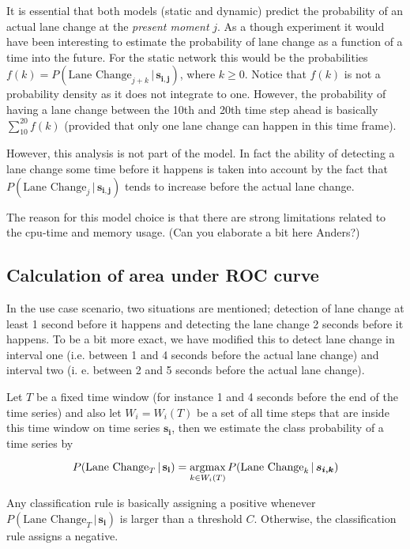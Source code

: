 \documentclass{article}
\theoremstyle{theorem}
\theoremstyle{definition}
\newcommand{\bu}[1]{\mathbf{#1}}
\newcommand{\bv}[1]{\bm{#1}}
\newcommand{\argmax}{\operatornamewithlimits{argmax}}
\begin{document}
It is essential that both models (static and dynamic) predict the probability of an actual lane change at the \emph{present moment} $j$.  As a though experiment it would have been interesting to estimate the probability of lane change as a function of a time into the future.  For the static network this would be the probabilities $f(k) = P(\mbox{Lane Change}_{j+ k} \,|\,  \bv{s_{i,j}})$, where $k \geq 0$. Notice that $f(k)$ is not a probability density as it does not integrate to one.  However, the probability of having a lane change between the 10th and 20th time step ahead is basically $\sum_{10}^{20}f(k)$ (provided that only one lane change can happen in this time frame).  

However, this analysis is not part of the model.  In fact the ability of detecting a lane change some time before it happens is taken into account by the fact that $P(\mbox{Lane Change}_j \,|\,  \bv{s_{i,j}})$ tends to increase before the actual lane change.  

The reason for this model choice is that there are strong limitations related to the cpu-time and memory usage. (Can you elaborate a bit here Anders?)

\subsection*{Calculation of area under ROC curve}

In the use case scenario, two situations are mentioned; detection of lane change at least 1 second before it happens and detecting the lane change 2 seconds before it happens.  To be a bit more exact, we have modified this to detect lane change in interval one (i.e. between 1 and 4 seconds before the actual lane change) and interval two (i. e. between 2 and 5 seconds before the actual lane change).  

Let $T$ be a fixed time window (for instance 1 and 4 seconds before the end of the time series) and also let $W_i = W_i(T)$ be a set of all time steps that are inside this time window on time series $ \bu{s_{i}}$,  then we estimate the class probability of a time series by 

\begin{equation}
P(\mbox{Lane Change}_{T} \,|\,  \bu{s_{i}})  = \argmax_{k \in W_i(T)} P(\mbox{Lane Change}_k \,|\,  \bv{s_{i,k}}) 
\end{equation}

Any classification rule is basically assigning a positive whenever $P(\mbox{Lane Change}_{T} \,|\,  \bu{s_{i}}) $ is larger than a threshold $C$.  Otherwise, the classification rule assigns a negative.  
\end{document}
